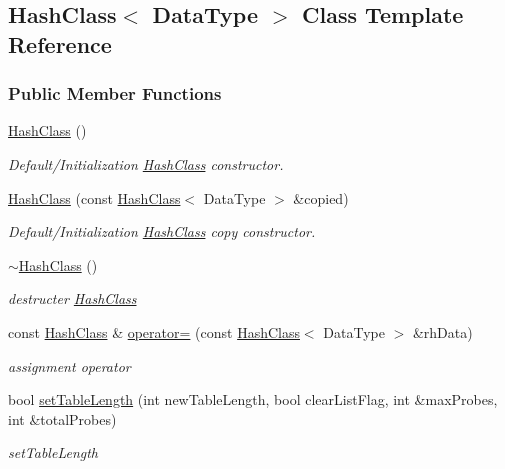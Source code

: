 \hypertarget{class_hash_class}{}\subsection{Hash\+Class$<$ Data\+Type $>$ Class Template Reference}
\label{class_hash_class}
\subsubsection*{Public Member Functions}
\begin{DoxyCompactItemize}
\item 
\hyperlink{class_hash_class_a29f061b09762f777ec04c0ecde9d0e2f}{Hash\+Class} ()
\begin{DoxyCompactList}\small\item\em Default/\+Initialization \hyperlink{class_hash_class}{Hash\+Class} constructor. \end{DoxyCompactList}\item 
\hyperlink{class_hash_class_ac74f631e62f65434795915436f59090b}{Hash\+Class} (const \hyperlink{class_hash_class}{Hash\+Class}$<$ Data\+Type $>$ \&copied)
\begin{DoxyCompactList}\small\item\em Default/\+Initialization \hyperlink{class_hash_class}{Hash\+Class} copy constructor. \end{DoxyCompactList}\item 
\hyperlink{class_hash_class_adbc7fbff24ae74ddac4261133ce80974}{$\sim$\+Hash\+Class} ()
\begin{DoxyCompactList}\small\item\em destructer \hyperlink{class_hash_class}{Hash\+Class} \end{DoxyCompactList}\item 
const \hyperlink{class_hash_class}{Hash\+Class} \& \hyperlink{class_hash_class_ad374ee1ee257757c208570267424524d}{operator=} (const \hyperlink{class_hash_class}{Hash\+Class}$<$ Data\+Type $>$ \&rh\+Data)
\begin{DoxyCompactList}\small\item\em assignment operator \end{DoxyCompactList}\item 
bool \hyperlink{class_hash_class_adb641bb48c4a3609520d18cfce3e78c5}{set\+Table\+Length} (int new\+Table\+Length, bool clear\+List\+Flag, int \&max\+Probes, int \&total\+Probes)
\begin{DoxyCompactList}\small\item\em set\+Table\+Length \end{DoxyCompactList}\item 

\end{DoxyCompactItemize}
